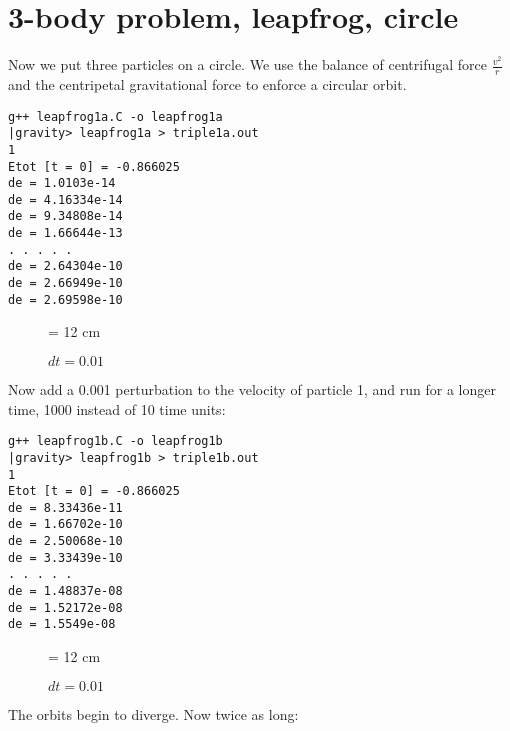 \documentclass{book}
\def\code#1{{\small}}
\begin{document}
\bigskip
\bigskip

\section{3-body problem, leapfrog, circle}

Now we put three particles on a circle.  We use the balance of
centrifugal force $ \frac{v^2}{r} $ and the centripetal gravitational
force to enforce a circular orbit.

\code{leapfrog1a.C}

\begin{small}
\begin{verbatim}
g++ leapfrog1a.C -o leapfrog1a
|gravity> leapfrog1a > triple1a.out
1
Etot [t = 0] = -0.866025
de = 1.0103e-14
de = 4.16334e-14
de = 9.34808e-14
de = 1.66644e-13
. . . . .
de = 2.64304e-10
de = 2.66949e-10
de = 2.69598e-10
\end{verbatim}
\end{small}

\begin{figure}
\begin{center}
\leavevmode
\epsfxsize = 12 cm
\caption{$dt = 0.01$}
\label{fig:triple1a}
\end{center}
\end{figure}

Now add a 0.001 perturbation to the velocity of particle 1, and run
for a longer time, 1000 instead of 10 time units:

\code{leapfrog1b.C}

\begin{small}
\begin{verbatim}
g++ leapfrog1b.C -o leapfrog1b
|gravity> leapfrog1b > triple1b.out
1
Etot [t = 0] = -0.866025
de = 8.33436e-11
de = 1.66702e-10
de = 2.50068e-10
de = 3.33439e-10
. . . . .
de = 1.48837e-08
de = 1.52172e-08
de = 1.5549e-08
\end{verbatim}
\end{small}

\begin{figure}
\begin{center}
\leavevmode
\epsfxsize = 12 cm
\caption{$dt = 0.01$}
\label{fig:triple1b}
\end{center}
\end{figure}

The orbits begin to diverge.
Now twice as long:

\code{leapfrog1c.C}
\end{document}

